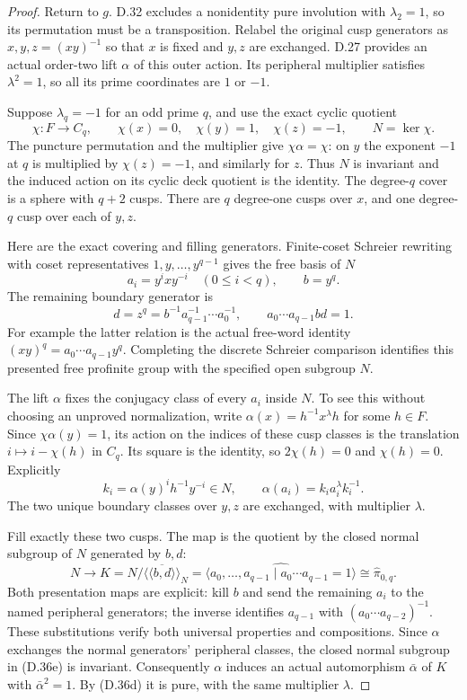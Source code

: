 \begin{proof}
Return to $g$.  D.32 excludes a nonidentity pure
involution with $\lambda_2=1$, so its permutation
must be a transposition.  Relabel the original cusp
generators as $x,y,z=(xy)^{-1}$ so that $x$ is fixed
and $y,z$ are exchanged.  D.27 provides an actual
order-two lift $\alpha$ of this outer action.
Its peripheral multiplier satisfies $\lambda^2=1$,
so all its prime coordinates are $1$ or $-1$.

Suppose $\lambda_q=-1$ for an odd prime $q$, and use
the exact cyclic quotient
\[
 \chi:F\longrightarrow C_q,\qquad
       \chi(x)=0,\quad\chi(y)=1,\quad\chi(z)=-1,
                   \qquad N=\ker\chi.                    \tag{D.36b}
\]
The puncture permutation and the multiplier give
$\chi\alpha=\chi$: on $y$ the exponent $-1$ at
$q$ is multiplied by $\chi(z)=-1$, and similarly
for $z$.  Thus $N$ is invariant and the induced
action on its cyclic deck quotient is the identity.
The degree-$q$ cover is a sphere with $q+2$ cusps.
There are $q$ degree-one cusps over $x$, and one
degree-$q$ cusp over each of $y,z$.

Here are the exact covering and filling generators.
Finite-coset Schreier rewriting with coset representatives
$1,y,\ldots,y^{q-1}$ gives the free basis of $N$
\[
 a_i=y^i x y^{-i}\quad(0\leq i<q),\qquad b=y^q.
\]
The remaining boundary generator is
\[
 d=z^q=b^{-1}a_{q-1}^{-1}\cdots a_0^{-1},
                     \qquad a_0\cdots a_{q-1}bd=1.        \tag{D.36c}
\]
For example the latter relation is the actual free-word
identity
$(xy)^q=a_0\cdots a_{q-1}y^q$.
Completing the discrete Schreier comparison identifies
this presented free profinite group with the specified
open subgroup $N$.

The lift $\alpha$ fixes the conjugacy class of every
$a_i$ inside $N$.  To see this without choosing an
unproved normalization, write
$\alpha(x)=h^{-1}x^\lambda h$ for some $h\in F$.
Since $\chi\alpha(y)=1$, its action on the indices
of these cusp classes is the translation
$i\mapsto i-\chi(h)$ in $C_q$.  Its square is the
identity, so $2\chi(h)=0$ and $\chi(h)=0$.
Explicitly
\[
 k_i=\alpha(y)^i h^{-1}y^{-i}\in N,\qquad
                \alpha(a_i)=k_i a_i^\lambda k_i^{-1}.     \tag{D.36d}
\]
The two unique boundary classes over $y,z$ are
exchanged, with multiplier $\lambda$.

Fill exactly these two cusps.  The map is the quotient
by the closed normal subgroup of $N$ generated by $b,d$:
\[
 N\longrightarrow
 K=N/\overline{\langle\!\langle b,d\rangle\!\rangle}_N
   =\widehat{\langle a_0,\ldots,a_{q-1}\mid
                             a_0\cdots a_{q-1}=1\rangle}
   \cong\widehat\pi_{0,q}.                               \tag{D.36e}
\]
Both presentation maps are explicit: kill $b$ and
send the remaining $a_i$ to the named peripheral
generators; the inverse identifies $a_{q-1}$ with
$(a_0\cdots a_{q-2})^{-1}$.  These substitutions
verify both universal properties and compositions.
Since $\alpha$ exchanges the normal generators'
peripheral classes, the closed normal subgroup
in (D.36e) is invariant.  Consequently $\alpha$
induces an actual automorphism $\bar\alpha$ of
$K$ with $\bar\alpha^2=1$.  By (D.36d) it is
pure, with the same multiplier $\lambda$.


\end{proof}
